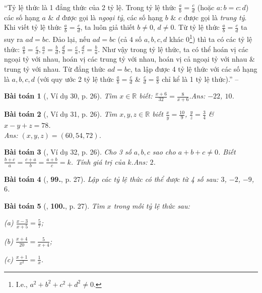 \documentclass{article}
\numberwithin{equation}{section}
\newtheorem{baitoan}{Bài toán}
\begin{document}
``Tỷ lệ thức là 1 đẳng thức của 2 tỷ lệ. Trong tỷ lệ thức $\frac{a}{b} = \frac{c}{d}$ (hoặc $a:b = c:d$) các số hạng $a$ \& $d$ được gọi là \textit{ngoại tỷ}, các số hạng $b$ \& $c$ được gọi là \textit{trung tỷ}. Khi viết tỷ lệ thức $\frac{a}{b} = \frac{c}{d}$, ta luôn giả thiết $b\ne 0$, $d\ne 0$. Từ tỷ lệ thức $\frac{a}{b} = \frac{c}{d}$ ta suy ra $ad = bc$. Đảo lại, nếu $ad = bc$ (cả $4$ số $a,b,c,d$ khác $0$\footnote{I.e., $a^2 + b^2 + c^2 + d^2\ne 0$.}) thì ta có các tỷ lệ thức: $\frac{a}{b} = \frac{c}{d},\frac{a}{c} = \frac{b}{d},\frac{d}{d} = \frac{c}{a},\frac{d}{c} = \frac{b}{a}$. Như vậy trong tỷ lệ thức, ta có thể hoán vị các ngoại tỷ với nhau, hoán vị các trung tỷ với nhau, hoán vị cả ngoại tỷ với nhau \& trung tỷ với nhau. Từ đẳng thức $ad = bc$, ta lập được 4 tỷ lệ thức với các số hạng là $a,b,c,d$ (với quy ước 2 tỷ lệ thức $\frac{a}{b} = \frac{c}{d}$ \& $\frac{c}{d} = \frac{a}{b}$ chỉ kể là 1 tỷ lệ thức).'' -- \cite[\S4]{Binh_Toan_7_tap_1}

\begin{baitoan}[\cite{Tuyen_Toan_7}, Ví dụ 30, p. 26]
	Tìm $x\in\mathbb{R}$ biết: $\frac{x + 6}{32} = \frac{8}{x + 6}$.\hfill\textsf{Ans:} $-22$, $10$.
\end{baitoan}

\begin{baitoan}[\cite{Tuyen_Toan_7}, Ví dụ 31, p. 26]
	Tìm $x,y,z\in\mathbb{R}$ biết $\frac{x}{y} = \frac{10}{9}$, $\frac{y}{z} = \frac{3}{4}$ \& $x - y + z = 78$.\\\mbox{}\hfill\textsf{Ans:} $(x,y,z) = (60,54,72)$.
\end{baitoan}

\begin{baitoan}[\cite{Tuyen_Toan_7}, Ví dụ 32, p. 26]
	Cho 3 số $a,b,c$ sao cho $a + b + c\ne 0$. Biết $\frac{b + c}{a} = \frac{c + a}{b} = \frac{a + b}{c} = k$. Tính giá trị của $k$.\hfill\textsf{Ans:} $2$.
\end{baitoan}

\begin{baitoan}[\cite{Tuyen_Toan_7}, \textbf{99.}, p. 27]
	Lập các tỷ lệ thức có thể được từ 4 số sau: $3$, $-2$, $-9$, $6$.
\end{baitoan}

\begin{baitoan}[\cite{Tuyen_Toan_7}, \textbf{100.}, p. 27]
	Tìm $x$ trong mỗi tỷ lệ thức sau:
	\begin{enumerate*}
		\item[(a)] $\frac{x - 3}{x + 5} = \frac{5}{7}$;
		\item[(b)] $\frac{x + 4}{20} = \frac{5}{x + 4}$;
		\item[(c)] $\frac{x + 1}{x^2} = \frac{1}{x}$.
	\end{enumerate*}
\end{baitoan}
\end{document}
